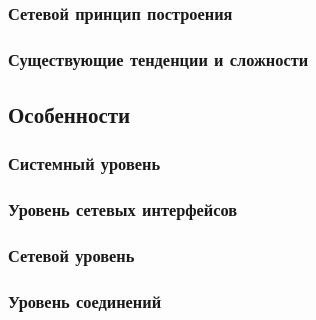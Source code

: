 \subsubsection{Сетевой принцип построения}

\subsubsection{Существующие тенденции и сложности}

\subsection{Особенности}

\subsubsection{Системный уровень}

\subsubsection{Уровень сетевых интерфейсов}

\subsubsection{Сетевой уровень}

\subsubsection{Уровень соединений}

\clearpage

